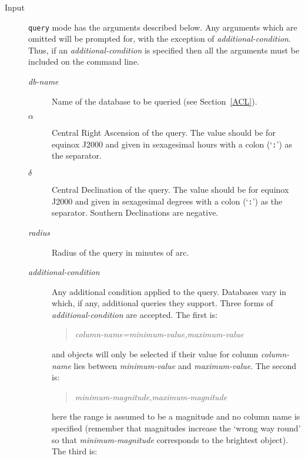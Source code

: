 \documentclass[twoside,11pt]{starlink}
\begin{document}
\begin{description}

  \item[Input] \texttt{query} mode has the arguments described below.  Any
   arguments which are omitted will be prompted for, with the exception of
   \textit{additional-condition}.  Thus, if an \textit{additional-condition}\/
   is specified then all the arguments must be included on the command line.

  \begin{description}

    \item[\textit{db-name}\/] Name of the database to be queried (see
     Section~\ref{ACL}).

    \item[$\alpha$\/] Central Right Ascension of the query.  The value
     should be for equinox J2000 and given in sexagesimal hours with
     a colon (`\texttt{:}') as the separator.

    \item[$\delta$\/] Central Declination of the query.  The value
     should be for equinox J2000 and given in sexagesimal degrees with
     a colon (`\texttt{:}') as the separator.  Southern Declinations are
     negative.

    \item[\textit{radius}\/] Radius of the query in minutes of arc.

    \item[\textit{additional-condition}\/] Any additional condition applied
     to the query.  Databases vary in which, if any, additional queries
     they support.  Three forms of \textit{additional-condition}\/ are
     accepted.  The first is:

    \begin{quote}
     \textit{column-name=minimum-value,maximum-value}
    \end{quote}

     and objects will only be selected if their value for column \textit{column-name}\/ lies between \textit{minimum-value}\/ and \textit{maximum-value}.  The second is:

    \begin{quote}
     \textit{minimum-magnitude,maximum-magnitude}
    \end{quote}

     here the range is assumed to be a magnitude and no column name is
     specified (remember that magnitudes increase the `wrong way round'
     so that \textit{minimum-magnitude}\/ corresponds to the brightest
     object).  The third is:


\end{description}
\end{description}
\end{document}
